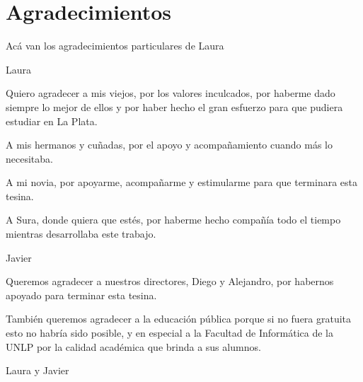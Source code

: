\documentclass[11pt]{report}
\begin{document}
\chapter*{Agradecimientos} %


Acá van los agradecimientos particulares de Laura


\begin{flushright}
Laura
\end{flushright}


Quiero agradecer a mis viejos, por los valores inculcados, por haberme dado siempre lo mejor de ellos y por haber hecho el gran esfuerzo para que pudiera estudiar en La Plata.

A mis hermanos y cuñadas, por el apoyo y acompañamiento cuando más lo necesitaba.

A mi novia, por apoyarme, acompañarme y estimularme para que terminara esta tesina.

A Sura, donde quiera que estés, por haberme hecho compañía  todo el tiempo mientras desarrollaba este trabajo.


\begin{flushright}
Javier
\end{flushright}


Queremos agradecer a nuestros directores, Diego y Alejandro, por habernos apoyado para terminar esta tesina.

También queremos agradecer a la educación pública porque si no fuera gratuita esto no habría sido posible,  y en especial a la Facultad de Informática de la UNLP por la calidad académica que brinda a sus alumnos.


\begin{flushright}
Laura y Javier
\end{flushright}

\tableofcontents
















{}
%

\listoffigures
\end{document}
